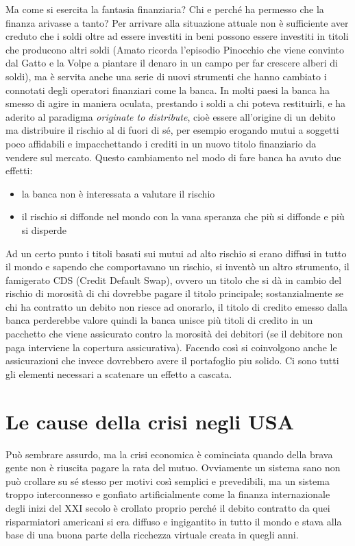 \documentclass[11pt]{article}
\begin{document}
Ma come si esercita la fantasia finanziaria?
Chi e perch\'e ha permesso che la finanza arivasse a tanto?
Per arrivare alla situazione attuale non \`e sufficiente aver creduto che i soldi oltre ad essere
investiti in beni possono essere investiti in titoli che producono 
altri soldi (Amato ricorda l'episodio Pinocchio che viene convinto 
dal Gatto e la Volpe a piantare il denaro in un campo per far crescere alberi di soldi), 
ma \`e servita anche una serie di nuovi strumenti che
hanno cambiato i connotati degli operatori finanziari come la banca.
In molti paesi la banca ha smesso di agire in maniera oculata, prestando i soldi a chi poteva restituirli,
e ha aderito al paradigma \emph{originate to distribute}, cio\`e  essere all'origine di un debito
ma distribuire il rischio al di fuori di s\'e, per esempio erogando mutui a soggetti poco affidabili e 
impacchettando i crediti in un nuovo titolo finanziario da vendere sul mercato.
Questo cambiamento nel modo di fare banca ha avuto due effetti:
\begin{itemize}
\item la banca non \`e interessata a valutare il rischio
\item il rischio si diffonde nel mondo con la vana speranza che pi\`u  si diffonde e pi\`u si disperde
\end{itemize}
Ad un certo punto i titoli basati sui mutui ad alto rischio si erano diffusi in tutto il mondo 
e sapendo che comportavano un rischio, si invent\`o 
un altro strumento, il famigerato CDS (Credit Default Swap), ovvero un
titolo che si d\`a in cambio del rischio di morosit\`a 
di chi dovrebbe pagare il titolo principale;
sostanzialmente se chi ha contratto un debito non riesce ad onorarlo,
il titolo di credito emesso dalla banca perderebbe valore quindi la banca
unisce pi\`u titoli di credito in un pacchetto che viene assicurato
contro la morosit\`a dei debitori (se il debitore non paga
interviene la copertura assicurativa). Facendo cos\`i si coinvolgono anche le assicurazioni
che invece dovrebbero avere il portafoglio piu solido. 
Ci sono tutti gli elementi necessari a scatenare un effetto a cascata.


\section{Le cause della crisi negli USA}
Pu\`o sembrare assurdo, ma la crisi economica \`e cominciata quando della brava
gente non \`e riuscita pagare la rata del mutuo.
Ovviamente un sistema sano non pu\`o crollare su s\'e stesso per motivi cos\`i
semplici e prevedibili, ma un sistema troppo interconnesso e gonfiato artificialmente
come la finanza internazionale degli inizi del XXI secolo \`e crollato proprio
perch\'e il debito contratto da quei risparmiatori americani si era diffuso e ingigantito
in tutto il mondo e stava alla base di una buona parte della ricchezza virtuale creata in quegli anni.
 
\end{document}
